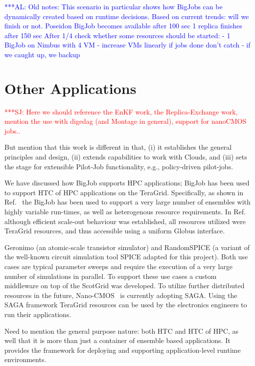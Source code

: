 \documentclass[conference,final]{IEEEtran}
\newcommand{\alnote}[1]{ {\textcolor{blue} { ***AL: #1 }}}
\newcommand{\jhanote}[1]{ {\textcolor{red} { ***SJ: #1 }}}
\newcommand{\alnote}[1]{}
\newcommand{\jhanote}[1]{}
\begin{document}
\alnote{Old notes: This scenario in particular shows how BigJobs can
  be dynamically created based on runtime decisions.  Based on current
  trends: will we finish or not.  Poseidon BigJob becomes available
  after 100 sec 1 replica finishes after 150 sec After 1/4 check
  whether some resources should be started: - 1 BigJob on Nimbus with
  4 VM - increase VMs linearly if jobs done don't catch - if we caught
  up, we backup}

\section{Other Applications}

\jhanote{Here we should reference the EnKF work, the Replica-Exchange
  work, mention the use with digedag (and Montage in general), support
  for nanoCMOS jobs..}

But mention that this work is different in that, (i) it establishes
the general principles and design, (ii) extends capabilities to work
with Clouds, and (iii) sets the stage for extensible Pilot-Job
functionality, e.g., policy-driven pilot-jobs.

We have discussed how BigJob supports HPC applications; BigJob has
been used to support HTC of HPC applications on the
TeraGrid. Specifically, as shown in Ref.~\cite{enkf-gmac09} the BigJob
has been used to support a very large number of ensembles with highly
variable run-times, as well as heterogenous resource requirements.  In
Ref.~\cite{enkf-gmac09} although efficient scale-out behaviour was
established, all resources utilized were TeraGrid resources, and thus
accessible using a uniform Globus interface. 

Geronimo (an atomic-scale transistor simulator) and RandomSPICE (a
variant of the well-known circuit simulation tool SPICE adapted for
this project). Both use cases are typical parameter sweeps and require
the execution of a very large number of simulations in parallel. To
support these use cases a custom middleware on top of the ScotGrid was
developed. To utilize further distributed resources in the future,
Nano-CMOS~\cite{nanocmos} is currently adopting SAGA. Using the SAGA
framework TeraGrid resources can be used by the electronics engineers
to run their applications.

Need to mention the general purpose nature: both HTC and HTC of HPC,
as well that it is more than just a container of ensemble based
applications.  It provides the framework for deploying and supporting
application-level runtime environments.
\end{document}

